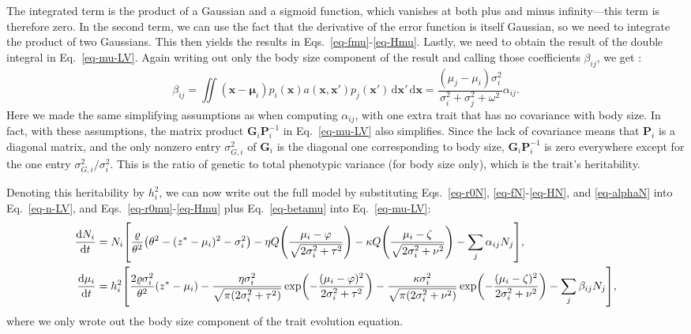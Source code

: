 \documentclass{article}
\newcommand{\mat}[1]{\bm{#1}}
\newcommand{\ud}{\text{d}}
\let\originalleft\left
\let\originalright\right
\renewcommand{\left}{\mathopen{}\mathclose\bgroup\originalleft}
\renewcommand{\right}{\aftergroup\egroup\originalright}
\begin{document}
The integrated term is the product of a Gaussian and a sigmoid function, which vanishes at both plus and minus infinity---this term is therefore zero. In the second term, we can use the fact that the derivative of the error function is itself Gaussian, so we need to integrate the product of two Gaussians. This then yields the results in Eqs.~\ref{eq-fmu}-\ref{eq-Hmu}. Lastly, we need to obtain the result of the double integral in Eq.~\ref{eq-mu-LV}. Again writing out only the body size component of the result and calling those coefficients $\beta_{ij}$, we get \citep{Barabasetal2022}:
\begin{equation}
  \label{eq-betamu}
  \beta_{ij}
  = \iint (\mat{x} - \mat{\mu}_i)
  p_i(\mat{x}) a(\mat{x},\mat{x}')
  p_j(\mat{x}')\,\ud\mat{x}'\,\ud\mat{x}
  = \frac{(\mu_j - \mu_i) \sigma_i^2}
  {\sigma_i^2 + \sigma_j^2 + \omega^2} \alpha_{ij} .
\end{equation}
Here we made the same simplifying assumptions as when computing $\alpha_{ij}$, with one extra trait that has no covariance with body size. In fact, with these assumptions, the matrix product $\mat{G}_i \mat{P}_i^{-1}$ in Eq.~\ref{eq-mu-LV} also simplifies. Since the lack of covariance means that $\mat{P}_i$ is a diagonal matrix, and the only nonzero entry $\sigma_{G,i}^2$ of $\mat{G}_i$ is the diagonal one corresponding to body size, $\mat{G}_i \mat{P}_i^{-1}$ is zero everywhere except for the one entry $\sigma_{G,i}^2 / \sigma_i^2$. This is the ratio of genetic to total phenotypic variance (for body size only), which is the trait's heritability.

Denoting this heritability by $h_i^2$, we can now write out the full model by substituting Eqs.~\ref{eq-r0N}, \ref{eq-fN}-\ref{eq-HN}, and \ref{eq-alphaN} into Eq.~\ref{eq-n-LV}, and Eqs.~\ref{eq-r0mu}-\ref{eq-Hmu} plus Eq.~\ref{eq-betamu} into Eq.~\ref{eq-mu-LV}:
\begin{align}
  \label{eq-n-full}
  \frac{\ud N_i}{\ud t}
  &= N_i \left[ \frac{\varrho}{\theta^2}
  \left(\theta^2 - (z^*-\mu_i)^2 - \sigma_i^2 \right)
  - \eta Q\left(\frac{\mu_i-\varphi}
  {\sqrt{2\sigma_i^2+\tau^2}}\right)
  - \kappa Q \left(\frac{\mu_i-\zeta}
  {\sqrt{2\sigma_i^2+\nu^2}}\right)
  - \sum_j \alpha_{ij} N_j \right] , \\
  \label{eq-mu-full}
  \frac{\ud \mu_i}{\ud t}
  &= h_i^2 \left[
  \frac{2\varrho\sigma_i^2}{\theta^2}\left(z^*-\mu_i\right) -
  \frac{\eta\sigma_i^2}{\sqrt{\pi(2\sigma_i^2+\tau^2)}}
  \exp\left( -\frac{(\mu_i-\varphi)^2}{2\sigma_i^2+\tau^2}\right) -
  \frac{\kappa\sigma_i^2}{\sqrt{\pi(2\sigma_i^2+\nu^2)}}
  \exp\left( -\frac{(\mu_i-\zeta)^2}{2\sigma_i^2+\nu^2} \right)
  - \sum_j \beta_{ij} N_j \right] ,
\end{align}
where we only wrote out the body size component of the trait evolution equation.
\end{document}
